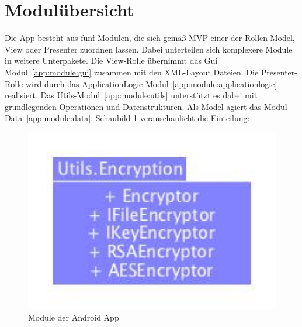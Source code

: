 \section{Modulübersicht}
Die App besteht aus fünf Modulen, die sich gemäß MVP einer der Rollen Model, View oder Presenter zuordnen lassen. Dabei unterteilen sich komplexere Module in weitere Unterpakete. Die View-Rolle übernimmt das Gui Modul~\eqref{app:module:gui} zusammen mit den XML-Layout Dateien. Die Presenter-Rolle wird durch das ApplicationLogic Modul~\eqref{app:module:applicationlogic} realisiert. Das Utils-Modul~\eqref{app:module:utils} unterstützt es dabei mit grundlegenden Operationen und Datenstrukturen. Als Model agiert das Modul Data~\eqref{app:module:data}. Schaubild \ref{fig:modules_overview} veranschaulicht die Einteilung:
\begin{figure}[ht]
	\centering
\includegraphics[width=1\textwidth]{./resources/Diagramme/App/modules_overview.jpg}
\caption{Module der Android App}
	\label{fig:modules_overview}
\end{figure}



